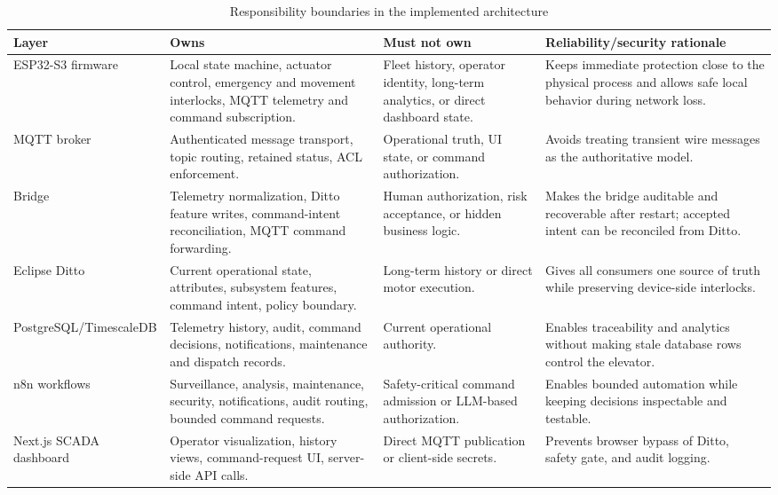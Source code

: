 \documentclass[journal]{IEEEtran}
\newcommand{\toprule}{\hline}
\newcommand{\midrule}{\hline}
\newcommand{\bottomrule}{\hline}
\begin{document}
\begin{table}[t]
\caption{Responsibility boundaries in the implemented architecture}
\label{tab:responsibility-boundaries}
\centering
\footnotesize
\begin{tabularx}{\textwidth}{@{}p{}p{}Yp{0.18\textwidth}@{}}
\toprule
Layer & Owns & Must not own & Reliability\slash security \mbox{rationale} \\
\midrule
ESP32-S3 firmware & Local state machine, actuator control, emergency and movement interlocks, MQTT telemetry and command subscription. & Fleet history, operator identity, long-term analytics, or direct dashboard state. & Keeps immediate protection close to the physical process and allows safe local behavior during network loss. \\
MQTT broker & Authenticated message transport, topic routing, retained status, ACL enforcement. & Operational truth, UI state, or command authorization. & Avoids treating transient wire messages as the authoritative model. \\
Bridge & Telemetry normalization, Ditto feature writes, command-intent reconciliation, MQTT command forwarding. & Human authorization, risk acceptance, or hidden business logic. & Makes the bridge auditable and recoverable after restart; accepted intent can be reconciled from Ditto. \\
Eclipse Ditto & Current operational state, attributes, subsystem features, command intent, policy boundary. & Long-term history or direct motor execution. & Gives all consumers one source of truth while preserving device-side interlocks. \\
PostgreSQL\slash TimescaleDB & Telemetry history, audit, command decisions, notifications, maintenance and dispatch records. & Current operational authority. & Enables traceability and analytics without making stale database rows control the elevator. \\
n8n workflows & Surveillance, analysis, maintenance, security, notifications, audit routing, bounded command requests. & Safety-critical command admission or LLM-based authorization. & Enables bounded automation while keeping decisions inspectable and testable. \\
Next.js SCADA \mbox{dashboard} & Operator visualization, history views, command-request UI, server-side API calls. & Direct MQTT publication or client-side secrets. & Prevents browser bypass of Ditto, safety gate, and audit logging. \\
\bottomrule
\end{tabularx}
\end{table}
\end{document}
